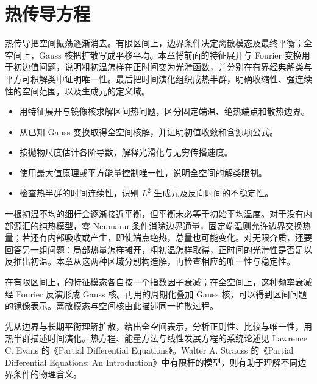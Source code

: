 \chapter{热传导方程}
\label{b2:ch:12}
\begin{chapterabstract}
热传导把空间振荡逐渐消去。有限区间上，边界条件决定离散模态及最终平衡；全空间上，Gauss 核把扩散写成平移平均。本章将前面的特征展开与 Fourier 变换用于初边值问题，说明粗初温怎样在正时间变为光滑函数，并分别在有界经典解类与平方可积解类中证明唯一性。最后把时间演化组织成热半群，明确收缩性、强连续性的空间范围，以及生成元的定义域。
\end{chapterabstract}

\begin{learninggoals}
\begin{itemize}
\item\label{b2:item:12-goal-boundary}用特征展开与镜像核求解区间热问题，区分固定端温、绝热端点和散热边界。
\item\label{b2:item:12-goal-kernel}从已知 Gauss 变换取得全空间核解，并证明初值收敛和含源项公式。
\item\label{b2:item:12-goal-smooth}按抛物尺度估计各阶导数，解释光滑化与无穷传播速度。
\item\label{b2:item:12-goal-unique}使用最大值原理或平方能量控制唯一性，说明全空间的解类限制。
\item\label{b2:item:12-goal-semigroup}检查热半群的时间连续性，识别 \(L^2\) 生成元及反向时间的不稳定性。
\end{itemize}
\end{learninggoals}

一根初温不均的细杆会逐渐接近平衡，但平衡未必等于初始平均温度。对于没有内部源汇的纯热模型，零 Neumann 条件消除边界通量，固定端温则允许边界交换热量；若还有内部吸收或产生，即使端点绝热，总量也可能变化。对无限介质，还要回答另一组问题：局部热量怎样摊开，粗初温怎样取得，正时间的光滑性是否足以反推出初温。本章从这两种区域分别构造解，再检查相应的唯一性与稳定性。

\ProseParagraphBreak

在有限区间上，的特征模态各自按一个指数因子衰减；在全空间上，这种频率衰减经 Fourier 反演形成 Gauss 核。再用的周期化叠加 Gauss 核，可以得到区间问题的镜像表示。离散模态与空间核由此描述同一扩散过程。

\ProseParagraphBreak

先从边界与长期平衡理解扩散，给出全空间表示，分析正则性、比较与唯一性，用热半群描述时间演化。热方程、能量方法与线性发展方程的系统论述见 Lawrence C. Evans 的《Partial Differential Equations》\cite{Evans2010Partial}。Walter A. Strauss 的《Partial Differential Equations: An Introduction》\cite{Strauss2008Partial}中有限杆的模型，则有助于理解不同边界条件的物理含义。

